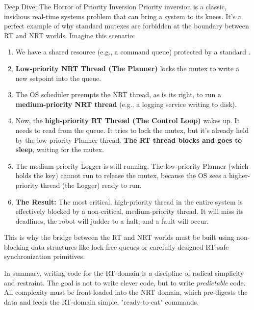 \vspace{0.3cm}
\begin{dangerbox}{Deep Dive: The Horror of Priority Inversion}
Priority inversion is a classic, insidious real-time systems problem that can bring a system to its knees. It's a perfect example of why standard mutexes are forbidden at the boundary between RT and NRT worlds. Imagine this scenario:
    
\begin{enumerate}
    \item We have a shared resource (e.g., a command queue) protected by a standard .
    \item \textbf{Low-priority NRT Thread (The Planner)} locks the mutex to write a new setpoint into the queue.
    \item The OS scheduler preempts the NRT thread, as is its right, to run a \textbf{medium-priority NRT thread} (e.g., a logging service writing to disk).
    \item Now, the \textbf{high-priority RT Thread (The Control Loop)} wakes up. It needs to read from the queue. It tries to lock the mutex, but it's already held by the low-priority Planner thread. \textbf{The RT thread blocks and goes to sleep}, waiting for the mutex.
    \item The medium-priority Logger is still running. The low-priority Planner (which holds the key) cannot run to release the mutex, because the OS sees a higher-priority thread (the Logger) ready to run.
    \item \textbf{The Result:} The most critical, high-priority thread in the entire system is effectively blocked by a non-critical, medium-priority thread. It will miss its deadlines, the robot will judder to a halt, and a  fault will occur.
\end{enumerate}
This is why the bridge between the RT and NRT worlds must be built using non-blocking data structures like lock-free queues or carefully designed RT-safe synchronization primitives.
\end{dangerbox}

In summary, writing code for the RT-domain is a discipline of radical simplicity and restraint. The goal is not to write clever code, but to write \textit{predictable} code. All complexity must be front-loaded into the NRT domain, which pre-digests the data and feeds the RT-domain simple, "ready-to-eat" commands.





